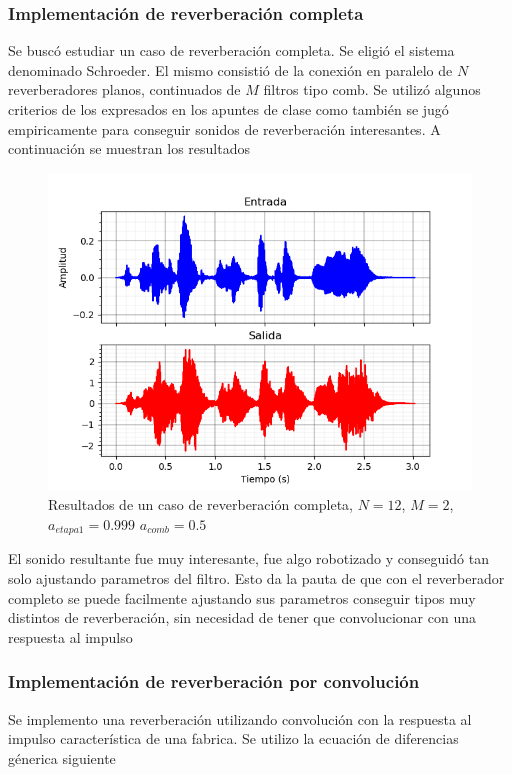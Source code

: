 \documentclass[assd_tp2_main.tex]{subfiles}
\begin{document}
\subsubsection{Implementación de reverberación completa}
Se buscó estudiar un caso de reverberación completa. Se eligió el sistema denominado Schroeder. El mismo consistió de la conexión en paralelo de $N$ reverberadores planos, continuados de $M$ filtros tipo comb. Se utilizó algunos criterios de los expresados en los apuntes de clase como también se jugó empiricamente para conseguir sonidos de reverberación interesantes.
A continuación se muestran los resultados
\begin{figure}[H]	
	\centering
	\includegraphics[scale=1]{graficos/EJ8/eco_completo.png}
	\caption{Resultados de un caso de reverberación completa, $N=12$, $M=2$, $a_{etapa1}=0.999$ $a_{comb}=0.5$}
	\label{fig:bloqueElemental}
\end{figure}
El sonido resultante fue muy interesante, fue algo robotizado y conseguidó tan solo ajustando parametros del filtro. Esto da la pauta de que con el reverberador completo se puede facilmente ajustando sus parametros conseguir tipos muy distintos de reverberación, sin necesidad de tener que convolucionar con una respuesta al impulso


\subsubsection{Implementación de reverberación por convolución}
Se implemento una reverberación utilizando convolución con la respuesta al impulso característica de una fabrica. Se utilizo la ecuación de diferencias génerica siguiente
\end{document}
